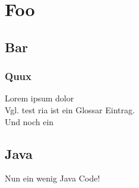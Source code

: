 \chapter{Foo}

\begin{intro}
	\Blindtext[1]
\end{intro}

	\section{Bar}
		\subsection{Quux}
Lorem ipsum dolor\\
Vgl. test
\gls{ria} ist ein Glossar Eintrag.\\
Und noch ein \\
\Blindtext[2][2]

	\section{Java}
	
Nun ein wenig Java Code!
